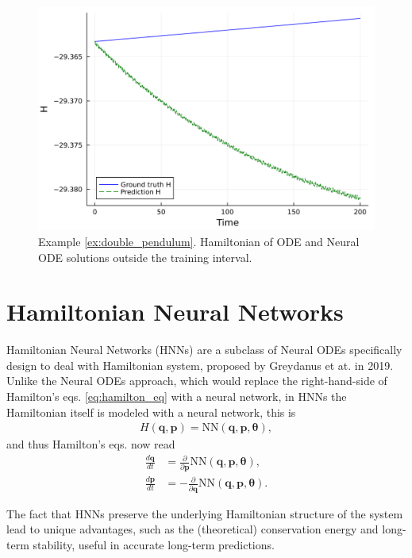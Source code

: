\documentclass[final,onefignum,onetabnum]{siamart220329}
\newcommand{\bol}{\boldsymbol}
\newcounter{example}
\begin{document}
\begin{figure}[h!]
	\centering
	\includegraphics[width=0.5\linewidth]{../examples/double_pendulum/hamiltonian}
	\caption{Example \ref{ex:double_pendulum}. Hamiltonian of ODE and Neural ODE solutions outside the training interval.}
	\label{fig:double_pendulum_hamiltonian}
\end{figure}

\section{Hamiltonian Neural Networks}\label{sec:hnn}
Hamiltonian Neural Networks (HNNs) are a subclass of Neural ODEs specifically design to deal with Hamiltonian system, proposed by Greydanus et at. in 2019\cite{greydanus2019hamiltonian}. Unlike the Neural ODEs approach, which would replace the right-hand-side of Hamilton's eqs. \eqref{eq:hamilton_eq} with a neural network, in HNNs the Hamiltonian itself is modeled with a neural network, this is
\begin{align}
	H(\bol q, \bol p) = \text{NN}(\bol q, \bol p,\bol \theta),
\end{align}
and thus Hamilton's eqs. now read
\begin{subequations}
	\begin{align}
		\frac{d\bol{q}}{dt} &= \frac{\partial}{\partial \bol{p}}\text{NN}(\bol q, \bol p,\bol \theta),\\
		\frac{d\bol{p}}{dt} &= -\frac{\partial}{\partial \bol{q}}\text{NN}(\bol q, \bol p,\bol \theta).
	\end{align}\label{eq:hnn_eq}
\end{subequations}

The fact that HNNs preserve the underlying Hamiltonian structure of the system lead to unique advantages, such as the (theoretical) conservation energy and long-term stability, useful in accurate long-term predictions.
\end{document}
